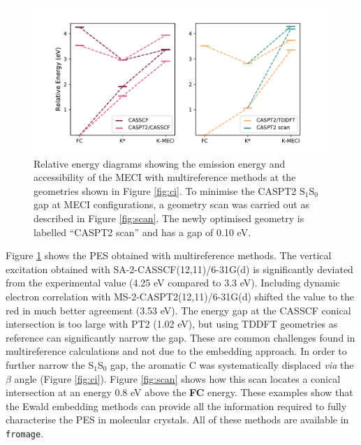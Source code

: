  
 \begin{figure}
\centering
\includegraphics[width=12cm]{Chapters/5Ewald/CAS_energy_figs.pdf}
\caption{Relative energy diagrams showing the emission energy and accessibility of the MECI with multireference methods at the geometries shown in Figure \ref{fig:ci}. To minimise the CASPT2 S$_1$\textendash{}S$_0$ gap at MECI configurations, a geometry scan was carried out as described in Figure \ref{fig:scan}. The newly optimised geometry is labelled ``CASPT2 scan'' and has a gap of 0.10 eV.}
\label{fig:ci_ener}
\end{figure}

Figure \ref{fig:ci_ener} shows the PES obtained with multireference methods.  The  vertical excitation obtained with SA-2-CASSCF(12,11)/6-31G(d) is significantly deviated from the experimental value (4.25 eV compared to 3.3 eV). Including dynamic electron correlation with MS-2-CASPT2(12,11)/6-31G(d) shifted the value to the red in much better agreement (3.53 eV). The energy gap at the CASSCF conical intersection is too large with PT2 (1.02 eV), but using TDDFT geometries as reference can significantly narrow the gap. These are common challenges found in multireference calculations and not due to the embedding approach.\cite{Peng2016,Crespo-otero2017,Barbatti2012} In order to further narrow the S$_1$\textendash{}S$_0$ gap, the aromatic C was systematically displaced \textit{via} the $\beta$ angle (Figure \ref{fig:ci}). Figure \ref{fig:scan} shows how this scan locates a conical intersection at an energy 0.8 eV above the \textbf{FC} energy. These examples show that the Ewald embedding methods can provide all the information required to fully characterise the PES in molecular crystals. All of these methods are available in \texttt{fromage}. 

